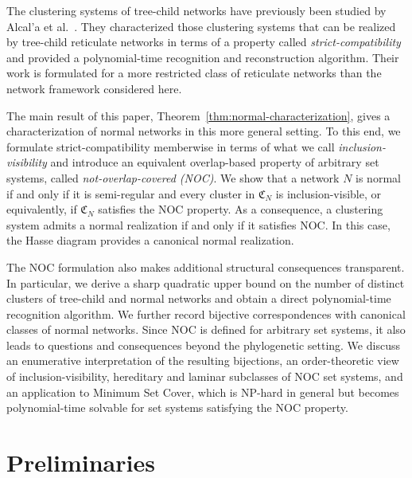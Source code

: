 \documentclass[preprint]{elsarticle}
\newcommand{\CS}[1][]{\ensuremath{\mathfrak{C}_{#1}}}
\newcommand{\REV}[1]{\begingroup#1\endgroup}
\begin{document}
The clustering systems of tree-child networks have previously been studied by Alcal{'a} et
al.~\cite{ALRR:14}. They characterized those clustering systems that can be realized by
tree-child reticulate networks in terms of a property called \emph{strict-compatibility} and
provided a polynomial-time recognition and reconstruction algorithm. Their work is formulated for
a more restricted class of reticulate networks than the network framework considered here.

The main result of this paper, Theorem~\ref{thm:normal-characterization}, gives a characterization
of normal networks in this more general setting. To this end, we formulate strict-compatibility
memberwise in terms of what we call \emph{inclusion-visibility} and introduce an equivalent
overlap-based property of arbitrary set systems, called \emph{not-overlap-covered (NOC)}. We show
that a network $N$ is normal if and only if it is semi-regular and every cluster in $\CS[N]$ is
inclusion-visible, or equivalently, if $\CS[N]$ satisfies the NOC property. As a consequence, a
clustering system admits a normal realization if and only if it satisfies NOC. In this case, the Hasse
diagram provides a canonical normal realization. 


The NOC formulation also makes additional structural consequences transparent. In particular, we
derive a sharp quadratic upper bound on the number of distinct clusters of tree-child and normal
networks and obtain a direct polynomial-time recognition algorithm. We further record bijective
correspondences with canonical classes of normal networks. Since NOC is defined for arbitrary set
systems, it also leads to questions and consequences beyond the \REV{phylogenetic setting. 
We discuss an enumerative interpretation of the resulting bijections, an order-theoretic
view of inclusion-visibility, hereditary and laminar subclasses of NOC set systems, and an
application to Minimum Set Cover, which is NP-hard in general but becomes polynomial-time solvable
for set systems satisfying the NOC property.}



\section{Preliminaries}
\end{document}

